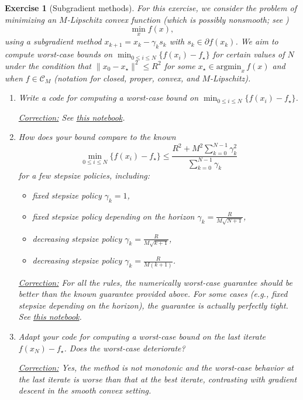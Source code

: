 \documentclass[11pt,a4paper]{article}
\newcommand{\correction}[1]{{{\color{blue}\underline{Correction:} #1}}}
\newcommand{\correction}[1]{}
\newtheorem{exercise}{Exercise}
\begin{document}
\begin{exercise}[Subgradient methods]\label{ex:subgradient} For this exercise, we consider the problem of minimizing an $M$-Lipschitz convex function (which is possibly nonsmooth; see )
	\[ \min_{x} f(x),\]
using a subgradient method $x_{k+1}=x_k-\gamma_k s_k$ with $s_k\in\partial f(x_k)$. We aim to compute worst-case bounds on $\min_{0\leqslant i\leqslant N}\{f(x_i)-f_\star\}$ for certain values of $N$ under the condition that $\|x_0-x_\star\|^2\leqslant R^2$ for some $x_\star\in\mathrm{argmin}_x \,f(x)$ and when $f\in\mathcal{C}_M$ (notation for closed, proper, convex, and $M$-Lipschitz). 
	\begin{enumerate}
	\item Write a code for computing a worst-case bound on $\min_{0\leqslant i\leqslant N}\{f(x_i)-f_\star\}$.
	
	\correction{See \href{https://github.com/PerformanceEstimation/Learning-Performance-Estimation/tree/main/Codes/Jupyter/Exercise08.ipynb}{this notebook}.}	
	
	\item How does your bound compare to the known
	\[ \min_{0\leqslant i\leqslant N}\{f(x_i)-f_\star\} \leqslant \frac{R^2+M^2\sum_{k=0}^{N-1}\gamma_k^2}{\sum_{k=0}^{N-1}\gamma_k}\]
	for a few stepsize policies, including:
	\begin{itemize}
	\item fixed stepsize policy $\gamma_k=1$,
	\item fixed stepsize policy depending on the horizon $\gamma_k=\frac{R}{M\sqrt{N+1}}$,
	\item decreasing stepsize policy $\gamma_k=\frac{R}{M\sqrt{k+1}}$,
	\item decreasing stepsize policy $\gamma_k=\frac{R}{M(k+1)}$.
	\end{itemize}
	
	\correction{For all the rules, the numerically worst-case guarantee should be better than the known guarantee provided above. For some cases (e.g., fixed stepsize depending on the horizon), the guarantee is actually perfectly tight. See \href{https://github.com/PerformanceEstimation/Learning-Performance-Estimation/tree/main/Codes/Jupyter/Exercise08.ipynb}{this notebook}.}
	
	\item Adapt your code for computing a worst-case bound on the last iterate $f(x_N)-f_\star$. Does the worst-case deteriorate?
	
	\correction{Yes, the method is not monotonic and the worst-case behavior at the last iterate is worse than that at the best iterate, contrasting with gradient descent in the smooth convex setting.}
	

\end{enumerate}
\end{exercise}
\end{document}
